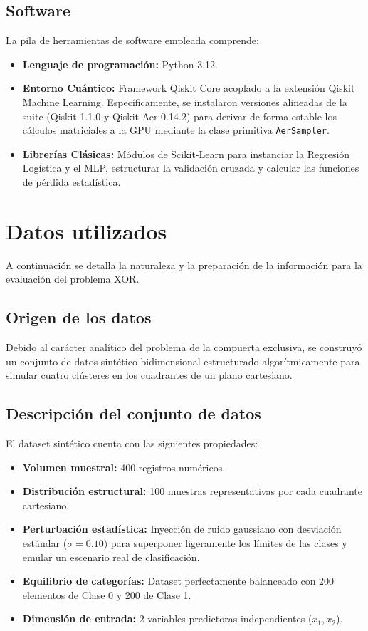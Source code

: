 \documentclass[12pt,oneside]{report}
\begin{document}
\subsection{Software}
La pila de herramientas de software empleada comprende:
\begin{itemize}
    \item \textbf{Lenguaje de programación:} Python 3.12.
    \item \textbf{Entorno Cuántico:} Framework Qiskit Core acoplado a la extensión Qiskit Machine Learning. Específicamente, se instalaron versiones alineadas de la suite (Qiskit 1.1.0 y Qiskit Aer 0.14.2) para derivar de forma estable los cálculos matriciales a la GPU mediante la clase primitiva \texttt{AerSampler}.
    \item \textbf{Librerías Clásicas:} Módulos de Scikit-Learn para instanciar la Regresión Logística y el MLP, estructurar la validación cruzada y calcular las funciones de pérdida estadística.
\end{itemize}

\section{Datos utilizados}
A continuación se detalla la naturaleza y la preparación de la información para la evaluación del problema XOR.

\subsection{Origen de los datos}
Debido al carácter analítico del problema de la compuerta exclusiva, se construyó un conjunto de datos sintético bidimensional estructurado algorítmicamente para simular cuatro clústeres en los cuadrantes de un plano cartesiano.

\subsection{Descripción del conjunto de datos}
El dataset sintético cuenta con las siguientes propiedades:
\begin{itemize}
    \item \textbf{Volumen muestral:} 400 registros numéricos.
    \item \textbf{Distribución estructural:} 100 muestras representativas por cada cuadrante cartesiano.
    \item \textbf{Perturbación estadística:} Inyección de ruido gaussiano con desviación estándar ($\sigma = 0.10$) para superponer ligeramente los límites de las clases y emular un escenario real de clasificación.
    \item \textbf{Equilibrio de categorías:} Dataset perfectamente balanceado con 200 elementos de Clase 0 y 200 de Clase 1.
    \item \textbf{Dimensión de entrada:} 2 variables predictoras independientes ($x_1, x_2$).
\end{itemize}
\end{document}
